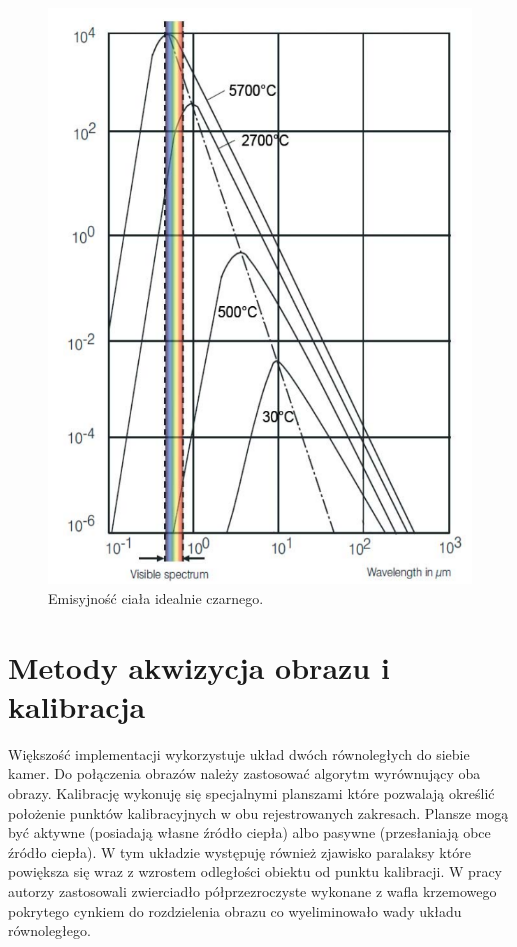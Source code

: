 \begin{figure}
\centering
\includegraphics[width=0.4\linewidth]{images/perfect_black_emi}
\caption[Emisyjność ciała idealnie czarnego]{Emisyjność ciała idealnie czarnego.}
\label{fig:atmosfera_int}
\end{figure}

\section{Metody akwizycja obrazu i kalibracja}

Większość implementacji wykorzystuje układ dwóch równoległych do siebie kamer. Do połączenia obrazów należy zastosować algorytm wyrównujący oba obrazy. Kalibrację wykonuję się specjalnymi  planszami które pozwalają określić położenie punktów kalibracyjnych w obu rejestrowanych zakresach. Plansze mogą być aktywne (posiadają własne źródło ciepła) albo pasywne (przesłaniają obce źródło ciepła). W tym układzie występuję również zjawisko paralaksy które powiększa się wraz z wzrostem odległości obiektu od punktu kalibracji. W pracy  \cite{hwang2015multispectral} autorzy zastosowali zwierciadło półprzezroczyste wykonane z wafla krzemowego pokrytego cynkiem do rozdzielenia obrazu co wyeliminowało wady układu równoległego.

